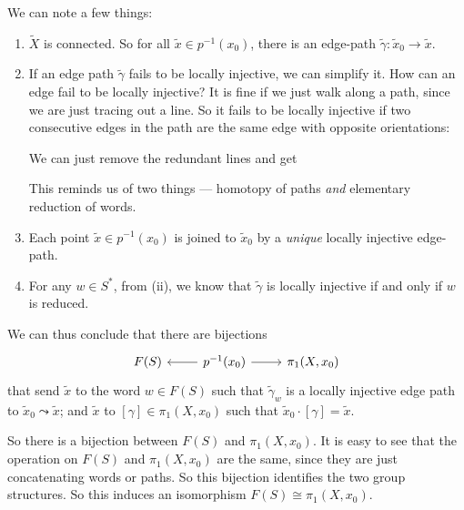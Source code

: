 \documentclass[a4paper]{article}
\begin{document}
We can note a few things:
\begin{enumerate}
  \item $\tilde{X}$ is connected. So for all $\tilde{x} \in p^{-1}(x_0)$, there is an edge-path $\tilde{\gamma}: \tilde{x}_0 \to \tilde{x}$.
  \item If an edge path $\tilde{\gamma}$ fails to be locally injective, we can simplify it. How can an edge fail to be locally injective? It is fine if we just walk along a path, since we are just tracing out a line. So it fails to be locally injective if two consecutive edges in the path are the same edge with opposite orientations:
    \begin{center}
    \end{center}
    We can just remove the redundant lines and get
    \begin{center}
    \end{center}
    This reminds us of two things --- homotopy of paths \emph{and} elementary reduction of words.
  \item Each point $\tilde{x} \in p^{-1}(x_0)$ is joined to $\tilde{x}_0$ by a \emph{unique} locally injective edge-path.
  \item For any $w \in S^*$, from (ii), we know that $\tilde{\gamma}$ is locally injective if and only if $w$ is reduced.
\end{enumerate}
We can thus conclude that there are bijections
\[
  \begin{tikzcd}
    F(S) & p^{-1}(x_0) \ar[l] \ar [r] & \pi_1(X, x_0)
  \end{tikzcd}
\]
that send $\tilde{x}$ to the word $w \in F(S)$ such that $\tilde{\gamma}_w$ is a locally injective edge path to $\tilde{x}_0 \leadsto \tilde{x}$; and $\tilde{x}$ to $[\gamma] \in \pi_1(X, x_0)$ such that $\tilde{x}_0 \cdot [\gamma] = \tilde{x}$.

So there is a bijection between $F(S)$ and $\pi_1(X, x_0)$. It is easy to see that the operation on $F(S)$ and $\pi_1(X, x_0)$ are the same, since they are just concatenating words or paths. So this bijection identifies the two group structures. So this induces an isomorphism $F(S)\cong \pi_1(X, x_0)$.
\end{document}
